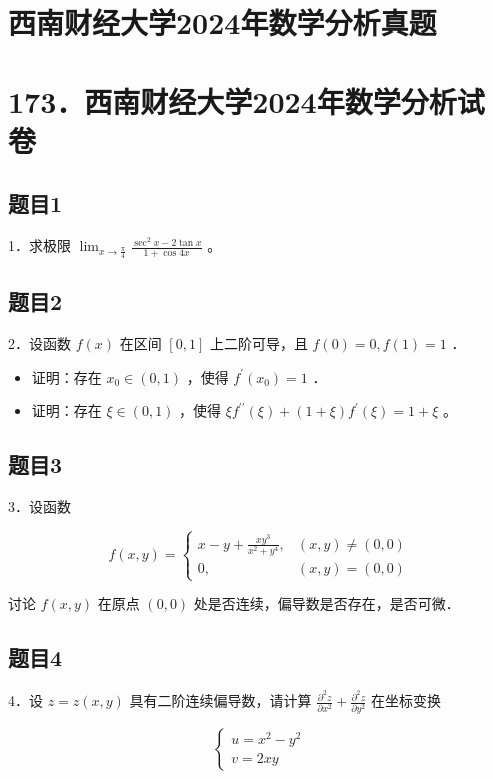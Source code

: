 \documentclass{article}
\begin{document}
\section*{西南财经大学2024年数学分析真题}
\section*{173．西南财经大学2024年数学分析试卷}

\subsection{题目1}
1．求极限 \(\lim _{x \rightarrow \frac{\pi}{4}} \frac{\sec ^{2} x-2 \tan x}{1+\cos 4 x}\) 。

\subsection{题目2}
2．设函数 \(f(x)\) 在区间 \([0,1]\) 上二阶可导，且 \(f(0)=0, f(1)=1\) ．

\begin{itemize}
  \item[（1）] 证明：存在 \(x_{0} \in(0,1)\) ，使得 \(f^{\prime}\left(x_{0}\right)=1\) ．
  \item[（2）] 证明：存在 \(\xi \in(0,1)\) ，使得 \(\xi f^{\prime \prime}(\xi)+(1+\xi) f^{\prime}(\xi)=1+\xi\) 。
\end{itemize}

\subsection{题目3}
3．设函数

\[
f(x, y)= \begin{cases}x-y+\frac{x y^{3}}{x^{2}+y^{4}}, & (x, y) \neq(0,0) \\ 0, & (x, y)=(0,0)\end{cases}
\]

讨论 \(f(x, y)\) 在原点 \((0,0)\) 处是否连续，偏导数是否存在，是否可微．

\subsection{题目4}
4．设 \(z=z(x, y)\) 具有二阶连续偏导数，请计算 \(\frac{\partial^{2} z}{\partial x^{2}}+\frac{\partial^{2} z}{\partial y^{2}}\) 在坐标变换

\[
\left\{\begin{array}{l}
u=x^{2}-y^{2} \\
v=2 x y
\end{array}\right.
\]
\end{document}
